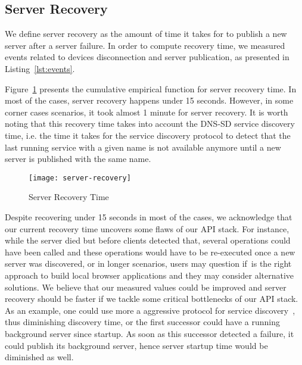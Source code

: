 \subsection{Server Recovery}
\label{sub:eval:server-recovery}

We define server recovery as the amount of time it takes for \APIName to publish a new server after a server failure.
In order to compute recovery time, we measured events related to devices disconnection and server publication, as presented
in Listing~\ref{lst:events}. 


Figure~\ref{fig:server-recovery} presents the cumulative empirical function for server recovery time.
In most of the cases, server recovery happens under 15 seconds. 
However, in some corner cases scenarios, it took almost 1 minute for server recovery. 
It is worth noting that this recovery time takes into account the DNS-SD service discovery time, 
i.e. the time it takes for the service discovery protocol to detect that the last running service with a given name is not available anymore until a new server is published with the same name. 



\begin{figure}
    \centering
    \texttt{[image: server-recovery]}
    \caption{Server Recovery Time}
    \label{fig:server-recovery}
\end{figure}


Despite recovering under 15 seconds in most of the cases,
we acknowledge that our current recovery time uncovers some flaws of our API stack.
For instance, while the server died but before clients detected that, several operations could have been called and these operations would have to be re-executed once a new server was discovered, 
or in longer scenarios, users may question if~\APIName is the right approach to build local browser applications and they may consider alternative solutions.
We believe that our measured values could be improved and server recovery should be faster if we tackle some critical bottlenecks of our API stack.
As an example, one could use more a aggressive protocol for service discovery~\cite{hong2007accelerating}, 
thus diminishing discovery time, or the first successor could have a running background server since startup.
As soon as this successor detected a failure, it could publish its background server, 
hence server startup time would be diminished as well. 
